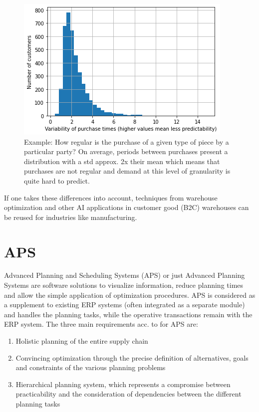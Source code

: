 \documentclass[fleqn,10pt]{SelfArx} %
\begin{document}
\begin{figure}[ht]\centering
\includegraphics[width=\linewidth]{purchasing_dsitribution.png}
\caption{Example: How regular is the purchase of a given type of piece by a particular party? On average, periods between purchases present a distribution with a std approx. 2x their mean
which means that purchases are not regular and demand at this level of granularity is quite hard to predict.}
\label{customer_demand}
\end{figure}

If one takes these differences into account, techniques from warehouse optimization and other AI applications in customer good (B2C) warehouses can be reused for industries like manufacturing.



\section{APS}

Advanced Planning and Scheduling Systems (APS) or just Advanced Planning Systems are software solutions to visualize information, reduce planning times and allow the simple application of optimization procedures. APS is considered as a supplement to existing ERP systems (often integrated as a separate module) and handles the planning tasks, while the operative transactions remain with the ERP system. \cite{ Stadtler2014}
The three main requirements acc. to \cite{Fleischmann2008} for APS are:
\begin{enumerate}
	\item Holistic planning of the entire supply chain
	\item Convincing optimization through the precise definition of alternatives, goals and constraints of the various planning problems
	\item Hierarchical planning system, which represents a compromise between practicability and the consideration of dependencies between the different planning tasks
\end{enumerate}
\end{document}
